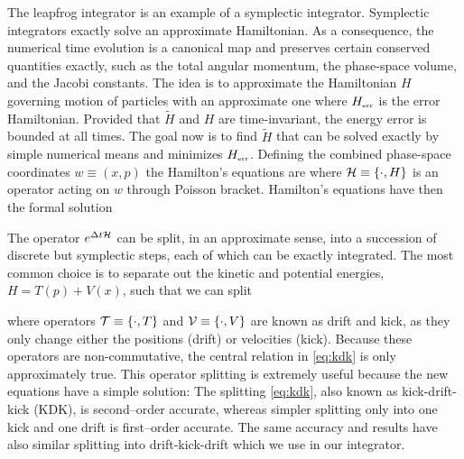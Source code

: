 The leapfrog integrator is an example of a symplectic integrator. Symplectic integrators exactly solve an approximate Hamiltonian. As a consequence, the numerical time evolution is a canonical map and preserves certain conserved quantities exactly, such as the total angular momentum, the phase-space volume, and the Jacobi constants. The idea is to approximate the Hamiltonian \(H\) governing motion of particles with an approximate one
where \(H_\text{\tiny err}\) is the error Hamiltonian. Provided that \(\tilde H\) and \(H\) are time-invariant, the energy error is bounded at all times. The goal now is to find \(\tilde H\) that can be solved exactly by simple numerical means and minimizes \(H_\text{\tiny err}\). Defining the combined phase-space coordinates \(w\equiv(x,p)\) the Hamilton's equations are
where \(\mathcal{H}\equiv\{\cdot,H\}\) is an operator acting on \(w\) through Poisson bracket. Hamilton’s equations have then the formal solution
\begin{sloppypar}
The operator \(e^{\Delta t\mathcal{H}}\) can be split, in an approximate sense, into a succession of discrete but symplectic steps, each of which can be exactly integrated. The most common choice is to separate out the kinetic and potential energies, \({H=T(p)+V(x)}\), such that we can split
\end{sloppypar}
where operators \(\mathcal{T}\equiv\{\cdot,T\}\) and \(\mathcal{V}\equiv\{\cdot,V\}\) are known as drift and kick, as they only change either the positions (drift) or velocities (kick). Because these operators are non-commutative, the central relation in \eqref{eq:kdk} is only approximately true. This operator splitting is extremely useful because the new equations have a simple solution:
The splitting \eqref{eq:kdk}, also known as kick-drift-kick (KDK), is second--order accurate, whereas simpler splitting only into one kick and one drift is first--order accurate. The same accuracy and results have also similar splitting into drift-kick-drift which we use in our integrator.
